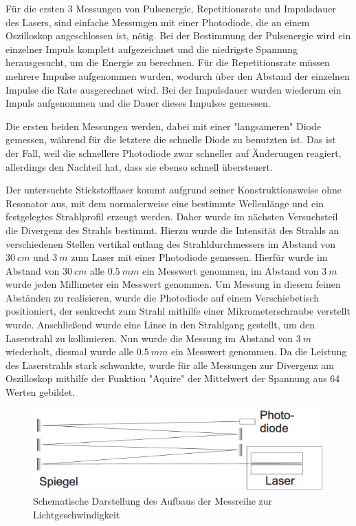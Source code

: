 \documentclass[
	a4paper,
	12pt,
	pagesize,
	ngerman
]{scrartcl}
\begin{document}
Für die ersten 3 Messungen von Pulsenergie, Repetitionsrate und Impulsdauer des Lasers, sind einfache Messungen mit einer Photodiode, die an einem Oszilloskop angeschlossen ist, nötig.
Bei der Bestimmung der Pulsenergie wird ein einzelner Impuls komplett aufgezeichnet und die niedrigste Spannung herausgesucht, um die Energie zu berechnen. 
Für die Repetitionsrate müssen mehrere Impulse aufgenommen wurden, wodurch über den Abstand der einzelnen Impulse die Rate ausgerechnet wird.
Bei der Impulsdauer wurden wiederum ein Impuls aufgenommen und die Dauer dieses Impulses gemessen.

Die ersten beiden Messungen werden, dabei mit einer "langsameren" Diode gemessen, während für die letztere die schnelle Diode zu benutzten ist. Das ist der Fall, weil die schnellere Photodiode zwar schneller auf Änderungen reagiert, allerdings den Nachteil hat, dass sie ebenso schnell übersteuert.

Der untersuchte Stickstofflaser kommt aufgrund seiner Konstruktionsweise ohne Resonator aus, mit dem normalerweise eine bestimmte Wellenlänge und ein festgelegtes Strahlprofil erzeugt werden. Daher wurde im nächsten Versuchsteil die Divergenz des Strahls bestimmt. Hierzu wurde die Intensität des Strahls an verschiedenen Stellen vertikal entlang des Strahldurchmessers im Abstand von $\SI{30}{cm}$ und $\SI{3}{m}$ zum Laser mit einer Photodiode gemessen. Hierfür wurde im Abstand von $\SI{30}{cm}$ alle $\SI{0,5}{mm}$ ein Messwert genommen, im Abstand von $\SI{3}{m}$ wurde jeden Millimeter ein Messwert genommen. Um Messung in diesem feinen Abständen zu realisieren, wurde die Photodiode auf einem Verschiebetisch positioniert, der senkrecht zum Strahl mithilfe einer Mikrometerschraube verstellt wurde.
Anschließend wurde eine Linse in den Strahlgang gestellt, um den Laserstrahl zu kollimieren. Nun wurde die Messung im Abstand von $\SI{3}{m}$ wiederholt, diesmal wurde alle $\SI{0,5}{mm}$ ein Messwert genommen. Da die Leistung des Laserstrahls stark schwankte, wurde für alle Messungen zur Divergenz am Oszilloskop mithilfe der Funktion "Aquire" der Mittelwert der Spannung aus 64 Werten gebildet.

\begin{figure}[h!]
	\centering
	\includegraphics[scale=0.9]{skizze_c.png}
	\caption{Schematische Darstellung des Aufbaus der Messreihe zur Lichtgeschwindigkeit}
	\label{skizze_c}
\end{figure}
\end{document}
